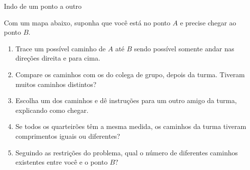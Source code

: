 \begin{task}{Indo de um ponto a outro}

Com um mapa abaixo, suponha que você está no ponto $A$ e precise chegar ao ponto $B.$ 

\begin{figure}[H]
\centering

\end{figure}

\begin{enumerate}
\item Trace um possível caminho de $A$ até $B$ sendo possível somente andar nas  direções direita e para cima.
\item Compare os caminhos com os do colega de grupo, depois da turma. Tiveram muitos caminhos distintos?
\item Escolha um dos caminhos e dê instruções para um outro amigo da turma, explicando como chegar. 
\item Se todos os quarteirões têm a mesma medida, os caminhos da turma tiveram comprimentos iguais ou diferentes?
\item Seguindo as restrições do problema, qual o número de diferentes caminhos existentes entre você e o ponto $B?$ 

\end{enumerate} 

\end{task}
\clearpage

